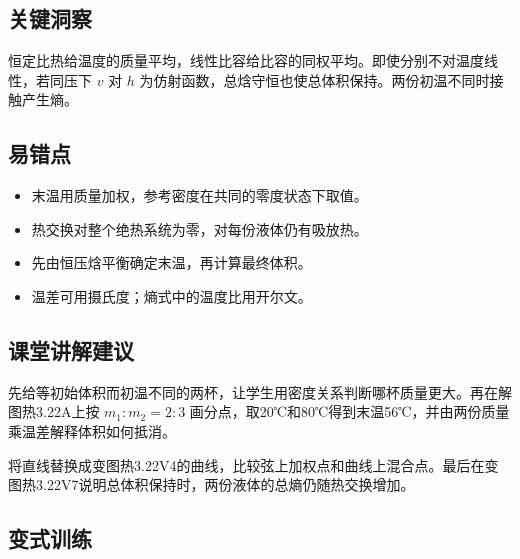 \documentclass[UTF8,fontset=fandol,a4paper,11pt]{ctexart}
\begin{document}


\subsection*{关键洞察}

恒定比热给温度的质量平均，线性比容给比容的同权平均。即使分别不对温度线性，若同压下 $v$ 对 $h$ 为仿射函数，总焓守恒也使总体积保持。两份初温不同时接触产生熵。



\subsection*{易错点}

\begin{itemize}
\item 末温用质量加权，参考密度在共同的零度状态下取值。
\item 热交换对整个绝热系统为零，对每份液体仍有吸放热。
\item 先由恒压焓平衡确定末温，再计算最终体积。
\item 温差可用摄氏度；熵式中的温度比用开尔文。
\end{itemize}



\subsection*{课堂讲解建议}

先给等初始体积而初温不同的两杯，让学生用密度关系判断哪杯质量更大。再在解图热3.22A上按 $m_1:m_2=2:3$ 画分点，取20℃和80℃得到末温56℃，并由两份质量乘温差解释体积如何抵消。

将直线替换成变图热3.22V4的曲线，比较弦上加权点和曲线上混合点。最后在变图热3.22V7说明总体积保持时，两份液体的总熵仍随热交换增加。



\subsection*{变式训练}
\end{document}
